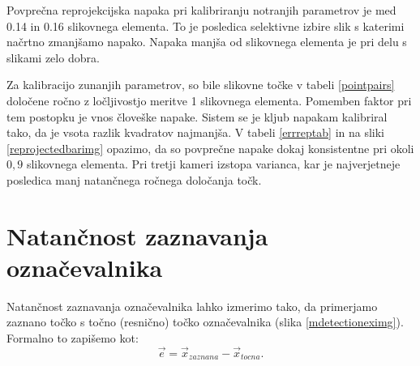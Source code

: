 \documentclass[a4paper, 12pt]{book}
\begin{document}
Povprečna reprojekcijska napaka pri kalibriranju notranjih parametrov je med 0.14 in 0.16 slikovnega elementa. To je posledica selektivne izbire slik s katerimi načrtno zmanjšamo napako. Napaka manjša od slikovnega elementa je pri delu s slikami zelo dobra. 

Za kalibracijo zunanjih parametrov, so bile slikovne točke v tabeli \ref{pointpairs} določene ročno z ločljivostjo meritve 1 slikovnega elementa. Pomemben faktor pri tem postopku je vnos človeške napake. Sistem se je kljub napakam kalibriral tako, da je vsota razlik kvadratov najmanjša. V tabeli \ref{errreptab} in na sliki \ref{reprojectedbarimg} opazimo, da so povprečne napake dokaj konsistentne pri okoli $0,9$ slikovnega elementa. Pri tretji kameri izstopa varianca, kar je najverjetneje posledica manj natančnega ročnega določanja točk.

\section{Natančnost zaznavanja označevalnika}
Natančnost zaznavanja označevalnika lahko izmerimo tako, da primerjamo zaznano točko s točno (resnično) točko označevalnika (slika \ref{mdetectioneximg}). Formalno to zapišemo kot:
\begin{equation}
\vec{e} = \vec{x}_{zaznana} - \vec{x}_{tocna}.
\end{equation}
\end{document}
